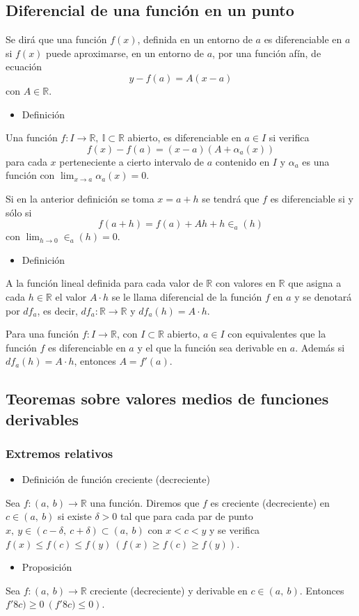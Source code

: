 \subsection{Diferencial de una función en un punto}
Se dirá que una función $f(x)$, definida en un entorno de $a$ es diferenciable en $a$ si $f(x)$ puede aproximarse, en un entorno de $a$, por una función afín, de ecuación \[ y-f(a)=A(x-a) \] con $ A\in \mathbb{R}. $
\begin{itemize}[label=\color{red}\textbullet, leftmargin=*]
	\item \color{lightblue}Definición
\end{itemize}
Una función $f:I\rightarrow\mathbb{R,~I\subset\mathbb{R}}$ abierto, es diferenciable en $a\in I$ si verifica \[ f(x)-f(a)=(x-a)(A+\alpha_a(x)) \] para cada $x$ perteneciente a cierto intervalo de $a$ contenido en $I$ y $\alpha_a$ es una función con $\lim_{x\to a}\alpha_a(x)=0$.

Si en la anterior definición se toma $x=a+h$ se tendrá que $f$ es diferenciable si y sólo si \[ f(a+h)=f(a)+Ah+h\in_a(h)\] con $\lim_{h\to0}\in_a(h)=0$.
\begin{itemize}[label=\color{red}\textbullet, leftmargin=*]
	\item \color{lightblue}Definición
\end{itemize}
A la función lineal definida para cada valor de $\mathbb{R}$ con valores en $\mathbb{R}$ que asigna a cada $h\in \mathbb{R}$ el valor $A\cdot h$ se le llama diferencial de la función $f$ en $a$ y se denotará por $df_a$, es decir, $df_a:\mathbb{R}\rightarrow\mathbb{R}$ y $df_a(h)=A\cdot h$.

Para una función $f:I\rightarrow\mathbb{R}$, con $I\subset\mathbb{R}$ abierto, $a\in I$ con equivalentes que la función $f$ es diferenciable en $a$ y el que la función sea derivable en $a$. Además si $df_a(h)=A\cdot h$, entonces  $A=f'(a)$.
\subsection{Teoremas sobre valores medios de funciones derivables}
\subsubsection{Extremos relativos}
\begin{itemize}[label=\color{red}\textbullet, leftmargin=*]
	\item \color{lightblue}Definición de función creciente (decreciente)
\end{itemize}
Sea $f:(a,~b)\rightarrow\mathbb{R}$ una función. Diremos que $f$ es creciente (decreciente) en $c\in(a,~b)$ si existe $\delta>0$ tal que para cada par de punto $x,~y\in(c-\delta,~c+\delta)\subset(a,~b)$ con $x<c<y$ y se verifica $f(x)\le f(c)\le f(y)~\left(f(x)\ge f(c)\ge f(y)\right)$.
\begin{itemize}[label=\color{red}\textbullet, leftmargin=*]
	\item \color{lightblue}Proposición
\end{itemize}
Sea $f:(a,~b)\rightarrow\mathbb{R}$ creciente (decreciente) y derivable en $c\in(a,~b)$. Entonces $f'8c)\ge0~\left(f'8c)\le0\right)$.

